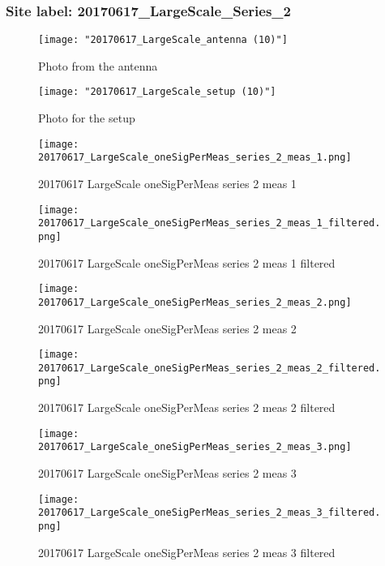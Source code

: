 \subsubsection{Site label: 20170617\_LargeScale\_Series\_2}
\begin{figure}[ht] \caption{Photo from the antenna}
\texttt{[image: "20170617\_LargeScale\_antenna (10)"]}\centering\end{figure}
\begin{figure}[ht] \caption{Photo for the setup}
\texttt{[image: "20170617\_LargeScale\_setup (10)"]}\centering\end{figure}
\begin{figure}[ht] \caption{20170617 LargeScale oneSigPerMeas series 2 meas 1}
\texttt{[image: 20170617\_LargeScale\_oneSigPerMeas\_series\_2\_meas\_1.png]}\centering\end{figure}
\begin{figure}[ht] \caption{20170617 LargeScale oneSigPerMeas series 2 meas 1 filtered}
\texttt{[image: 20170617\_LargeScale\_oneSigPerMeas\_series\_2\_meas\_1\_filtered.png]}\centering\end{figure}
\begin{figure}[ht] \caption{20170617 LargeScale oneSigPerMeas series 2 meas 2}
\texttt{[image: 20170617\_LargeScale\_oneSigPerMeas\_series\_2\_meas\_2.png]}\centering\end{figure}
\begin{figure}[ht] \caption{20170617 LargeScale oneSigPerMeas series 2 meas 2 filtered}
\texttt{[image: 20170617\_LargeScale\_oneSigPerMeas\_series\_2\_meas\_2\_filtered.png]}\centering\end{figure}
\begin{figure}[ht] \caption{20170617 LargeScale oneSigPerMeas series 2 meas 3}
\texttt{[image: 20170617\_LargeScale\_oneSigPerMeas\_series\_2\_meas\_3.png]}\centering\end{figure}
\begin{figure}[ht] \caption{20170617 LargeScale oneSigPerMeas series 2 meas 3 filtered}
\texttt{[image: 20170617\_LargeScale\_oneSigPerMeas\_series\_2\_meas\_3\_filtered.png]}\centering\end{figure}
\clearpage
